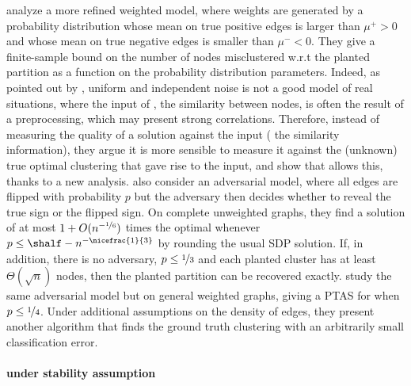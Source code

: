 \Textcite{Joachims2005} analyze a more refined weighted model, where weights are generated by a
probability distribution whose mean on true positive edges is larger than $\mu^+>0$ and whose mean
on true negative edges is smaller than $\mu^-<0$. They give a finite-sample bound on the number of
nodes misclustered w.r.t the planted partition as a function on the probability distribution
parameters. Indeed, as pointed out by \textcite{plantedAilon09}, uniform and independent noise is
not a good model of real situations, where the input of \pcc{}, \ie{} the similarity between nodes,
is often the result of a preprocessing, which may present strong correlations. Therefore, instead of
measuring the quality of a solution against the input (\ie{} the similarity information), they
argue it is more sensible to measure it against the (unknown) true optimal clustering that gave rise
to the input, and show that \ccpivot{} allows this, thanks to a new analysis. \Textcite{Mathieu2010}
also consider an adversarial model, where all edges are flipped with probability $p$ but the
adversary then decides whether to reveal the true sign or the flipped sign. On complete unweighted
graphs, they find a solution of \mind{} at most $1 + O(n^{-\nicefrac{1}{6}})$ times the optimal
whenever $p \leq \shalf - n^{-\nicefrac{1}{3}}$ by rounding the usual SDP solution. If, in addition,
there is no adversary, $p\leq\nicefrac{1}{3}$ and each planted cluster has at least
$\Theta(\sqrt{n})$ nodes, then the planted partition can be recovered exactly.
\Textcite{Makarychev2014} study the same adversarial model but on general weighted graphs, giving a PTAS
for \mind{} when $p\leq \nicefrac{1}{4}$. Under additional assumptions on the density of edges, they
present another algorithm that finds the ground truth clustering with an arbitrarily small
classification error.

\paragraph{\pcc{} under stability assumption}

